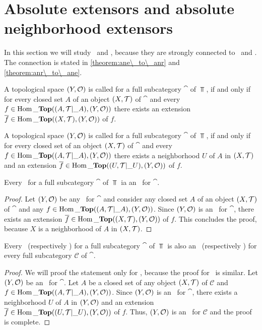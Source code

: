 \section{Absolute extensors and absolute neighborhood extensors}

In this section we will study \aexs\ and \anes, because they are strongly connected to \ars\ and \anrs. The connection is stated in \ref{theorem:ane\_to\_anr} and \ref{theorem:anr\_to\_ane}. 

\begin{definition}
	A topological space $\tspace[Y][O]$ is called \textit{\aex} for a full subcategory $\cat$ of $\Top$, if and only if for every closed set $A$ of an object $\tspace$ of $\cat$ and every $f \in \Hom\_\Top\pbraces{\reltspace, \tspace[Y][O]}$ there exists an extension $\overline{f} \in \Hom\_\Top\pbraces{\tspace, \tspace[Y][O]}$ of $f$.  
\end{definition}

\begin{definition}
	A topological space $\tspace[Y][O]$ is called \textit{\ane} for a full subcategory $\cat$ of $\Top$, if and only if for every closed set of an object $\tspace$ of $\cat$ and every $f \in \Hom\_\Top\pbraces{\reltspace, \tspace[Y][O]}$ there exists a neighborhood $U$ of $A$ in $\tspace$ and an extension $\overline{f} \in \Hom\_\Top\pbraces{\reltspace[U], \tspace[Y][O]}$ of $f$.
\end{definition}

\begin{proposition}
	Every \aex\ for a full subcategory $\cat$ of $\Top$ ia an \ane\ for $\cat$. 
\end{proposition}
\begin{proof}
	Let $\tspace[Y][O]$ be any \aex\ for $\cat$ and consider any closed set $A$ of an object $\tspace$ of $\cat$ and any $f \in \Hom\_\Top\pbraces{\reltspace, \tspace[Y][O]}$. Since $\tspace[Y][O]$ is an \aex\ for $\cat$, there exists an extension $\overline{f} \in \Hom\_\Top\pbraces{\tspace, \tspace[Y][O]}$ of $f$. This concludes the proof, because $X$ is a neighborhood of $A$ in $\tspace$. 
\end{proof}

\begin{proposition}
	Every \aex\ (respectively \ane) for a full subcategory $\cat$ of $\Top$ is also an \aex\ (respectively \ane) for every full subcategory $\mathcal{C}$ of $\cat$. 
\end{proposition}
\begin{proof}
	We will proof the statement only for \anes, because the proof for \aexs\ is similar. Let $\tspace[Y][O]$ be an \ane\ for $\cat$. Let $A$ be a closed set of any object $\tspace$ of $\mathcal{C}$ and $f \in \Hom\_\Top\pbraces{\reltspace, \tspace[Y][O]}$. Since $\tspace[Y][O]$ is an \ane\ for $\cat$, there exists a neighborhood $U$ of $A$ in $\tspace[Y][O]$ and an extension $\overline{f} \in \Hom\_\Top\pbraces{\reltspace[U], \tspace[Y][O]}$ of $f$. Thus, $\tspace[Y][O]$ is an \ane\ for $\mathcal{C}$ and the proof is complete.
\end{proof}

